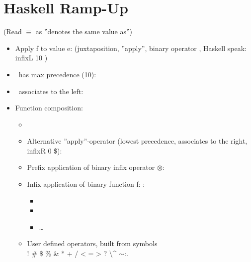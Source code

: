 

\section{Haskell Ramp-Up} %
\label{cha:haskell_ramp_up}

(Read $\equiv$ as ''denotes the same value as'')

\begin{itemize}
    \item Apply f to value e:  (juxtaposition, ''apply'', binary operator \textvisiblespace, Haskell speak: infixL 10 \textvisiblespace)
    \item \textvisiblespace\ has max precedence (10): 
    \item \textvisiblespace\ associates to the left:  
    \item Function composition:
    \begin{itemize}
        \item {}
        \item Alternative ''apply''-operator \codeline{|\$|} (lowest precedence, associates to the right, infixR 0 \$):\\
        \item Prefix application of binary infix operator $\otimes$:  
        \item Infix application of binary function f: :
        \begin{itemize}
            \item {}
            \item {}
            \item \dots
        \end{itemize}
        \item User defined operators, built from symbols \\ ! \# \$ \% \& * + / < = > ? \@ \textbackslash \string^ \textbar $\sim$:.
    \end{itemize}
\end{itemize}

